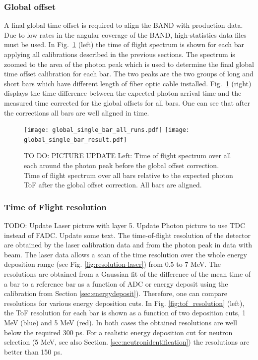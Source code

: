 \documentclass[3p,final,twocolumn]{elsarticle}
\begin{document}
\subsubsection{Global offset}
\label{sec:global_offset}
A final global time offset is required to align the BAND with production data. Due to low rates in the angular coverage of the BAND, 
high-statistics data files must be used. 
In Fig.~\ref{fig:final_offset} (left) the time of flight spectrum is shown for each bar applying all calibrations described in the previous sections. The spectrum is zoomed to the area of the photon peak which is used to determine the final global time offset calibration for each bar. The two peaks are the two groups of long and short bars which have different length of fiber optic cable installed. Fig.~\ref{fig:final_offset} (right) displays the time difference between the expected photon arrival time and the measured time corrected for the global offsets for all bars. One can see that after the corrections all bars are well aligned in time.
\begin{figure}[tb]
	\centering
		\texttt{[image: global\_single\_bar\_all\_runs.pdf]}
		\texttt{[image: global\_single\_bar\_result.pdf]}
	\caption{TO DO: PICTURE UPDATE Left: Time of flight spectrum over all each around the photon peak before the global offset correction. Time of flight spectrum over all bars relative to the expected photon ToF after  the global offset correction. All bars are aligned.}
	\label{fig:final_offset}
\end{figure}

\subsubsection{Time of Flight resolution}
\label{sec:tofresolution}

{\color{red} TODO: Update Laser picture with layer 5. Update Photon picture to use TDC instead of FADC. Update some text.}
The time-of-flight resolution of the detector are obtained by the laser calibration data and from the photon peak in data with beam. The laser data allows a scan of the time resolution over the whole energy deposition range (see Fig. \ref{fig:resolution-laser}) from 0.5 to 7 \si{\mega\electronvolt}. The resolutions are obtained from a Gaussian fit of the difference of the mean time of a bar to a reference bar as a function of ADC or energy deposit using the calibration from Section \ref{sec:energydeposit}). Therefore, one can compare resolutions for various energy deposition cuts. In Fig. \ref{fig:tof_resolution} (left), the ToF resolution for each bar is shown as a function of two deposition cuts, 1 \si{\mega\electronvolt} (blue) and 5 \si{\mega\electronvolt} (red). In 
both cases the obtained resolutions are well below the required 300 \si{\pico\s}. For a realistic energy deposition cut for neutron selection (5 \si{\mega\electronvolt}, see also Section. \ref{sec:neutronidentification}) the resolutions are better than 150 \si{\pico\s}.
\end{document}
